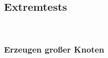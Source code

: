 %



\newpage



\label{Abschnitt:Tests:Protokoll:Extrem}



\subsection*{Extremtests}

~\\


\label{Abschnitt:Tests:Protokoll:Extrem:Knoten_Erzeugen}

\subsubsection*{Erzeugen großer Knoten}




